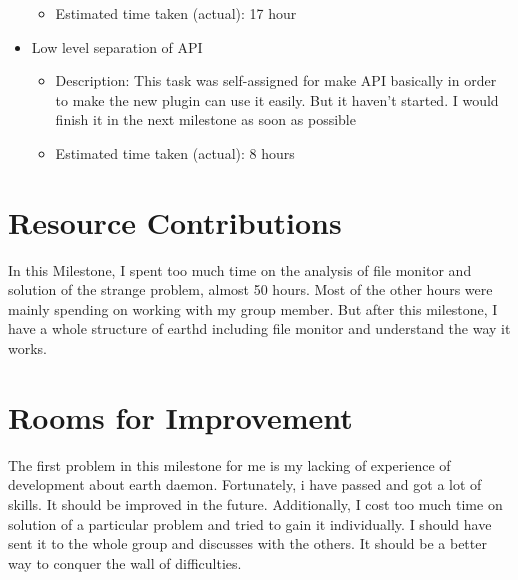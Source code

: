 \documentclass{article}
\begin{document}
\begin{itemize}
\begin{itemize}
	         \item Estimated time taken (actual): 17 hour
	     \end{itemize}
	\item Low level separation of API
	     \begin{itemize}
	         \item Description: This task was self-assigned for make API basically in order to make the new plugin can use it easily. But it haven't started. I would finish it in the next milestone as soon as possible
	         \item Estimated time taken (actual): 8 hours
	     \end{itemize}
\end{itemize}

\section*{Resource Contributions}

In this Milestone, I spent too much time on the analysis of file monitor and solution of the strange problem, almost 50 hours. Most of the other hours were mainly spending on working with my group member. But after this milestone, I have a whole structure of earthd including file monitor and understand the way it works.

\section*{Rooms for Improvement}


The first problem in this milestone for me is my lacking of experience of development about earth daemon. Fortunately, i have passed and got a lot of skills. It should be improved in the future. Additionally, I cost too much time on solution of a particular problem and tried to gain it individually. I should have sent it to the whole group and discusses with the others. It should be a better way to conquer the wall of difficulties.
\end{document}
